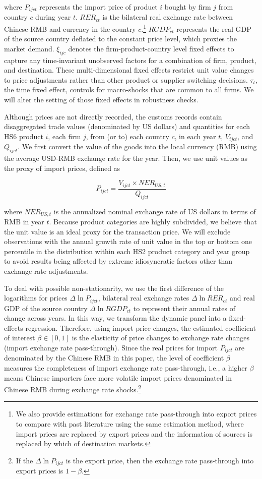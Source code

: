 \noindent where $P_{ijct}$ represents the import price of product $i$ bought by firm $j$ from country $c$ during year $t$. $R E R_{c t}$ is the bilateral real exchange rate between Chinese RMB and currency in the country $c$.\footnote{We also provide estimations for exchange rate pass-through into export prices to compare with past literature using the same estimation method, where import prices are replaced by export prices and the information of sources is replaced by which of destination markets.} $RGDP_{ct}$ represents the real GDP of the source country deflated to the constant price level, which proxies the market demand. $\xi_{ijc}$ denotes the firm-product-country level fixed effects to capture any time-invariant unobserved factors for a combination of firm, product, and destination. These multi-dimensional fixed effects restrict unit value changes to price adjustments rather than other product or supplier switching decisions. $\tau_t$, the time fixed effect, controls for macro-shocks that are common to all firms. We will alter the setting of those fixed effects in robustness checks.

Although prices are not directly recorded, the customs records contain disaggregated trade values (denominated by US dollars) and quantities for each HS6 product $i$, each firm $j$, from (or to) each country $c$, in each year $t$, $V_{ijct}$, and $Q_{ijct}$. We first convert the value of the goods into the local currency (RMB) using the average USD-RMB exchange rate for the year. Then, we use unit values as the proxy of import prices, defined as 

$$
P_{ijct}=\frac{V_{ijct}\times NER_{US,t}}{Q_{ijct}}
$$

\noindent where $NER_{US,t}$ is the annualized nominal exchange rate of US dollars in terms of RMB in year $t$. Because product categories are highly subdivided, we believe that the unit value is an ideal proxy for the transaction price. We will exclude observations with the annual growth rate of unit value in the top or bottom one percentile in the distribution within each HS2 product category and year group to avoid results being affected by extreme idiosyncratic factors other than exchange rate adjustments.

To deal with possible non-stationarity, we use the first difference of the logarithms for prices $\Delta \ln P_{i j c t}$, bilateral real exchange rates $\Delta \ln R E R_{c t}$ and real GDP of the source country $\Delta \ln R G D P_{c t}$ to represent their annual rates of change across years. In this way, we transform the dynamic panel into a fixed-effects regression. Therefore, using import price changes, the estimated coefficient of interest $\beta \in [0,1]$ is the elasticity of price changes to exchange rate changes (import exchange rate pass-through). Since the real prices for import $P_{i j c t}$ are denominated by the Chinese RMB in this paper, the level of coefficient $\beta$ measures the completeness of import exchange rate pass-through, i.e., a higher $\beta$ means Chinese importers face more volatile import prices denominated in Chinese RMB during exchange rate shocks.\footnote{If the $\Delta \ln P_{i j c t}$ is the export price, then the exchange rate pass-through into export prices is $1-\beta$.}

